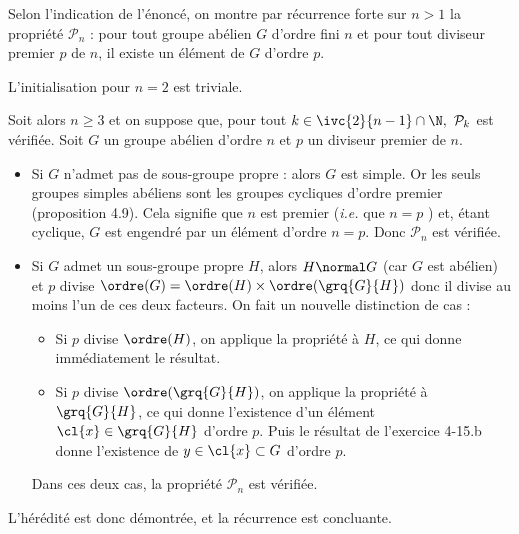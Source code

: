 
Selon l'indication de l'énoncé, on montre par récurrence forte sur $n>1$ la propriété $\mathcal{P}_n$ : pour tout groupe abélien $G$ d'ordre fini $n$ et pour tout diviseur 
premier $p$ de $n$, il existe un élément de $G$ d'ordre $p$.

L'initialisation pour $n = 2$ est triviale.

Soit alors $n\geq 3$ et on suppose que, pour tout $k\in \ivc{2}{n-1}\cap \N,~ \mathcal{P}_k$ est vérifiée. Soit $G$ un groupe abélien d'ordre $n$ et $p$ un diviseur premier 
de $n$.
\begin{itemize}
  \item Si $G$ n'admet pas de sous-groupe propre : alors $G$ est simple. Or les seuls groupes simples abéliens sont les groupes cycliques d'ordre premier (proposition 4.9).
   Cela signifie que $n$ est premier (\emph{i.e.} que $n=p$ ) et, étant cyclique, $G$ est engendré par un élément d'ordre $n=p$. Donc $\mathcal{P}_n$ est vérifiée.
  \item Si $G$ admet un sous-groupe propre $H$, alors $H \normal G$ (car $G$ est abélien) et $p$ divise $\ordre(G) = \ordre(H)\times \ordre(\grq{G}{H})$ donc il divise au moins l'un de ces deux facteurs. On fait un nouvelle distinction de cas :
  \begin{itemize}
    \item Si $p$ divise $\ordre(H)$, on applique la propriété à $H$, ce qui donne immédiatement le résultat. 
    \item Si $p$ divise $\ordre(\grq{G}{H})$, on applique la propriété à $\grq{G}{H}$, ce qui donne l'existence d'un élément $\cl{x} \in \grq{G}{H}$ d'ordre $p$. Puis le résultat de l'exercice 4-15.b 
    donne l'existence de $y\in \cl{x}\subset G$ d'ordre $p$. 
  \end{itemize} 
  Dans ces deux cas, la propriété $\mathcal{P}_n$ est vérifiée.
\end{itemize}
L'hérédité est donc démontrée, et la récurrence est concluante.
